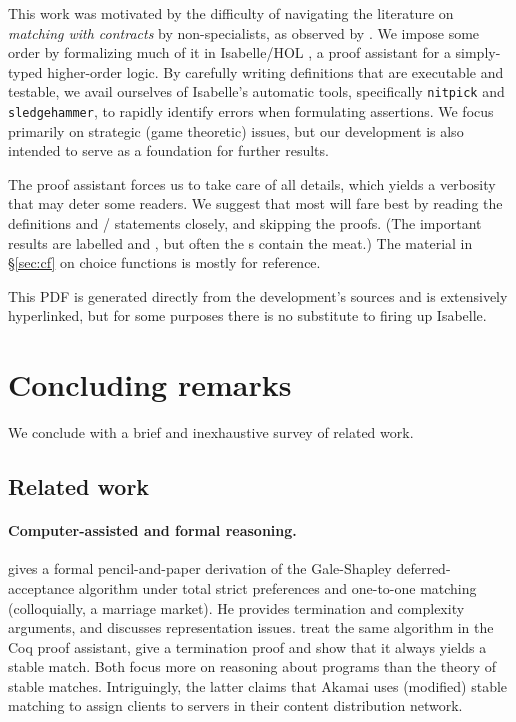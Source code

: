\documentclass[11pt,a4paper]{article}
\begin{document}
This work was motivated by the difficulty of navigating the literature
on \emph{matching with contracts} by non-specialists, as observed by
\citet{VCG-EC:2015,VCG-AFP:2015}. We impose some order by formalizing
much of it in Isabelle/HOL \citep{Nipkow-Paulson-Wenzel:2002}, a proof
assistant for a simply-typed higher-order logic. By carefully writing
definitions that are executable and testable, we avail ourselves of
Isabelle's automatic tools, specifically \verb!nitpick! and
\verb!sledgehammer!, to rapidly identify errors when formulating
assertions. We focus primarily on strategic (game theoretic) issues,
but our development is also intended to serve as a foundation for
further results.

The proof assistant forces us to take care of all details, which
yields a verbosity that may deter some readers. We suggest that most
will fare best by reading the definitions and
/ statements
closely, and skipping the proofs. (The important results are labelled
 and , but
often the s contain the meat.) The material
in \S\ref{sec:cf} on choice functions is mostly for reference.

This PDF is generated directly from the development's sources and is
extensively hyperlinked, but for some purposes there is no substitute
to firing up Isabelle.





\section{Concluding remarks}

We conclude with a brief and inexhaustive survey of related work.

\subsection{Related work}

\paragraph{Computer-assisted and formal reasoning.}
\citet{Bijlsma:1991} gives a formal pencil-and-paper derivation of the
Gale-Shapley deferred-acceptance algorithm under total strict
preferences and one-to-one matching (colloquially, a marriage
market). He provides termination and complexity arguments, and
discusses representation issues. \citet{HamidCastleberry:2010} treat
the same algorithm in the Coq proof assistant, give a termination
proof and show that it always yields a stable match. Both focus more
on reasoning about programs than the theory of stable
matches. Intriguingly, the latter claims that Akamai uses (modified)
stable matching to assign clients to servers in their content
distribution network.
\end{document}
